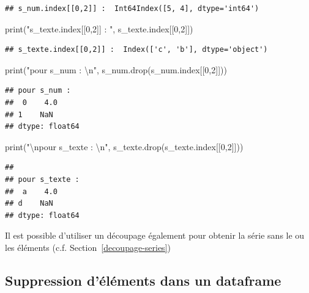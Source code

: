 \documentclass[12pt,]{book}
\newenvironment{Shaded}{\begin{snugshade}}{\end{snugshade}}
\newcommand{\DecValTok}[1]{\textcolor[rgb]{0.00,0.00,0.81}{#1}}
\newcommand{\CharTok}[1]{\textcolor[rgb]{0.31,0.60,0.02}{#1}}
\newcommand{\StringTok}[1]{\textcolor[rgb]{0.31,0.60,0.02}{#1}}
\newcommand{\BuiltInTok}[1]{#1}
\newcommand{\NormalTok}[1]{#1}
\numberwithin{equation}{section}
\numberwithin{countremarque}{section}
\begin{document}
\begin{lstlisting}
## s_num.index[[0,2]] :  Int64Index([5, 4], dtype='int64')
\end{lstlisting}

\begin{Shaded}
\begin{Highlighting}[]
\BuiltInTok{print}\NormalTok{(}\StringTok{"s_texte.index[[0,2]] : "}\NormalTok{, s_texte.index[[}\DecValTok{0}\NormalTok{,}\DecValTok{2}\NormalTok{]])}
\end{Highlighting}
\end{Shaded}

\begin{lstlisting}
## s_texte.index[[0,2]] :  Index(['c', 'b'], dtype='object')
\end{lstlisting}

\begin{Shaded}
\begin{Highlighting}[]
\BuiltInTok{print}\NormalTok{(}\StringTok{"pour s_num : }\CharTok{\textbackslash{}n}\StringTok{"}\NormalTok{, s_num.drop(s_num.index[[}\DecValTok{0}\NormalTok{,}\DecValTok{2}\NormalTok{]]))}
\end{Highlighting}
\end{Shaded}

\begin{lstlisting}
## pour s_num : 
##  0    4.0
## 1    NaN
## dtype: float64
\end{lstlisting}

\begin{Shaded}
\begin{Highlighting}[]
\BuiltInTok{print}\NormalTok{(}\StringTok{"}\CharTok{\textbackslash{}n}\StringTok{pour s_texte : }\CharTok{\textbackslash{}n}\StringTok{"}\NormalTok{, s_texte.drop(s_texte.index[[}\DecValTok{0}\NormalTok{,}\DecValTok{2}\NormalTok{]]))}
\end{Highlighting}
\end{Shaded}

\begin{lstlisting}
## 
## pour s_texte : 
##  a    4.0
## d    NaN
## dtype: float64
\end{lstlisting}

Il est possible d'utiliser un découpage également pour obtenir la série
sans le ou les éléments (c.f. Section~\ref{decoupage-series})

\subsection{Suppression d'éléments dans un
dataframe}\label{suppression-delements-dans-un-dataframe}
\end{document}
